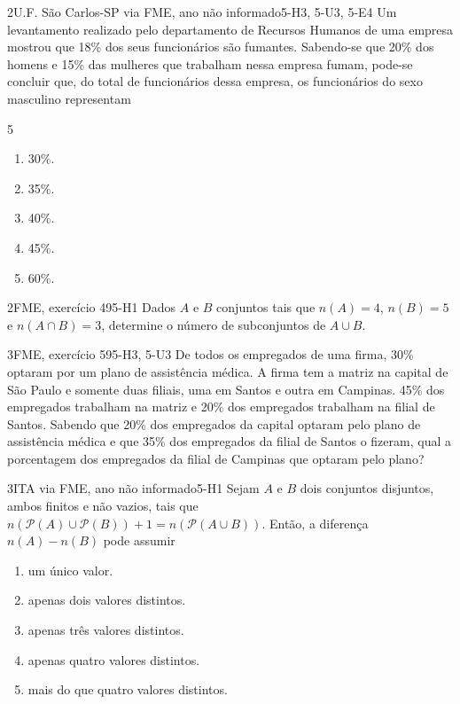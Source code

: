 \begin{questao}{2}{U.F. São Carlos-SP via FME, ano não informado}{5-H3, 5-U3, 5-E4}\label{u5:ufscar18}
Um levantamento realizado pelo departamento de Recursos Humanos de uma empresa mostrou que 18\% dos seus funcionários são fumantes. Sabendo-se que 20\% dos homens e 15\% das mulheres que trabalham nessa empresa fumam, pode-se concluir que, do total de funcionários dessa empresa, os funcionários do sexo masculino representam
\begin{multicols}{5}
\begin{enumerate}[label=\alph*)]
  \item 30\%.
  \item 35\%.
  \item 40\%.
  \item 45\%.
  \item 60\%.
\end{enumerate}
\end{multicols}
\end{questao}

\begin{questao}[integradora]{2}{FME, exercício 49}{5-H1}\label{u5:fme49}
Dados $A$ e $B$ conjuntos tais que $n(A)=4$, $n(B)=5$ e $n(A\cap B)=3$, determine o número de subconjuntos de $A\cup B$.
\end{questao}

\begin{questao}{3}{FME, exercício 59}{5-H3, 5-U3}\label{u5:fme59}
De todos os empregados de uma firma, 30\% optaram por um plano de assistência médica. A firma tem a matriz na capital de São Paulo e somente duas filiais, uma em Santos e outra em Campinas. 45\% dos empregados trabalham na matriz e 20\% dos empregados trabalham na filial de Santos. Sabendo que 20\% dos empregados da capital optaram pelo plano de assistência médica e que 35\% dos empregados da filial de Santos o fizeram, qual a porcentagem dos empregados da filial de Campinas que optaram pelo plano?
\end{questao}

\begin{questao}[integradora]{3}{ITA via FME, ano não informado}{5-H1}\label{u5:ita41}
Sejam $A$ e $B$ dois conjuntos disjuntos, ambos finitos e não vazios, tais que $n(\mathcal{P}(A)\cup\mathcal{P}(B))+1=n(\mathcal{P}(A\cup B))$. Então, a diferença $n(A)-n(B)$ pode assumir
\begin{enumerate}[label=\alph*)]
  \item um único valor.
  \item apenas dois valores distintos.
  \item apenas três valores distintos.
  \item apenas quatro valores distintos.
  \item mais do que quatro valores distintos.
\end{enumerate}
\end{questao}


